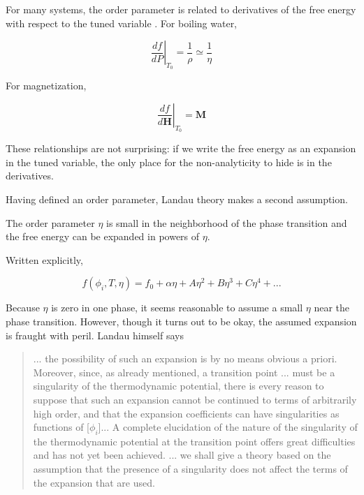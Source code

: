 For many systems, the order parameter is related to derivatives of the free energy with respect to the tuned variable \cite{Binder1987}. For boiling water,

\begin{equation}
\left. \frac{df}{dP} \right\vert_{T_{0}} = \frac{1}{\rho} \simeq \frac{1}{\eta}
\end{equation}

For magnetization,

\begin{equation}
\left. \frac{df}{d\mathbf{H}}\right\vert_{T_{0}} = \mathbf{M}
\end{equation}

These relationships are not surprising: if we write the free energy as an expansion in the tuned variable, the only place for the non-analyticity to hide is in the derivatives.

Having defined an order parameter, Landau theory makes a second assumption.

\begin{assumption}
The order parameter $\eta$ is small in the neighborhood of the phase transition and the free energy can be expanded in powers of $\eta$.
\end{assumption}

Written explicitly,

\begin{equation}
f(\phi_{i},T,\eta) = f_{0} + \alpha \eta + A \eta^{2} + B \eta^{3} + C \eta^{4} + ...
\end{equation}

Because $\eta$ is zero in one phase, it seems reasonable to assume a small $\eta$ near the phase transition. However, though it turns out to be okay, the assumed expansion is fraught with peril. Landau himself says \cite{Landau1969}

\begin{quote}
... the possibility of such an expansion is by no means obvious a priori. Moreover, since, as already mentioned, a transition point ... must be a singularity of the thermodynamic potential, there is every reason to suppose that such an expansion cannot be continued to terms of arbitrarily high order, and that the expansion coefficients can have singularities as functions of [$\phi_{i}$]... A complete elucidation of the nature of the singularity of the thermodynamic potential at the transition point offers great difficulties and has not yet been achieved. ... we shall give a theory based on the assumption that the presence of a singularity does not affect the terms of the expansion that are used.
\end{quote}

